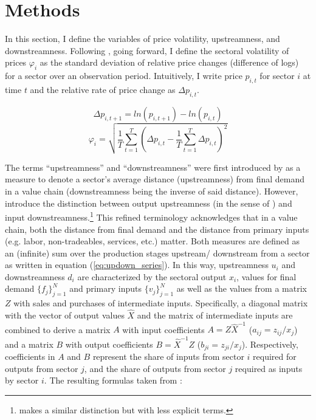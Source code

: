 \section{Methods} \label{sec:methods}

In this section, I define the variables of price volatility, upstreamness, and downstreamness. Following 
\textcite{boivin2009StickyPricesMonetary}, going forward, I define the sectoral volatility of prices $\varphi_i$ as the standard deviation 
of relative price changes (difference of logs) for a sector over an observation period. Intuitively, I write price $p_{i,t}$ for sector $i$ 
at time $t$ and the relative rate of price change as $\Delta p_{i,t}$.%

\begin{equation}\label{eq:deltap}
    \Delta p_{i,t+1} = ln(p_{i,t+1}) - ln(p_{i,t})
\end{equation}
\begin{equation}\label{eq:def_volat}
    \varphi_i = \sqrt{\frac{1}{T} \sum_{t=1}^T \left( \Delta p_{i,t} - \frac{1}{T} \sum_{t=1}^T \Delta p_{i,t} \right)^2}
\end{equation}

The terms ``upstreamness'' and ``downstreamness'' were first introduced by \textcite{antras2012MeasuringUpstreamnessProduction} as a measure 
to denote a sector's average distance (upstreamness) from final demand in a value chain (downstreamness being the inverse of said distance).
However, \textcite{miller2017OutputUpstreamnessInput} introduce the distinction between output upstreamness (in the sense of 
\textcite{antras2012MeasuringUpstreamnessProduction}) and input downstreamness.\footnote{\textcite{fally2012ProductionStagingMeasurement} 
makes a similar distinction but with less explicit terms.} This refined terminology acknowledges that in a value chain, both the distance from
final demand and the distance from primary inputs (e.g. labor, non-tradeables, services, etc.) matter. Both measures are defined as an 
(infinite) sum over the production stages upstream/ downstream from a sector as written in equation (\ref{eq:updown_series}). In this way, 
upstreamness $u_i$ and downstreamness $d_i$ are characterized by the sectoral output $x_i$, values for final demand $\{f_j\}_{j=1}^N$ and 
primary inputs $\{v_j\}_{j=1}^N$ as well as the values from a matrix $Z$ with sales and purchases of intermediate inputs. Specifically, 
a diagonal matrix with the vector of output values $\hat{X}$ and the matrix of intermediate inputs are combined to derive a matrix $A$ 
with input coefficients $A = Z \hat{X}^{-1}$ ($a_{ij} = z_{ij}/x_j$) and a matrix $B$ with output coefficients 
$B = \hat{X}^{-1} Z$ ($b_{ji} = z_{ji}/x_j$). Respectively, coefficients in $A$ and $B$ represent the share of inputs from sector $i$ 
required for outputs from sector $j$, and the share of outputs from sector $j$ required as inputs by sector $i$. The resulting formulas 
taken from \textcite{miller2017OutputUpstreamnessInput}:

